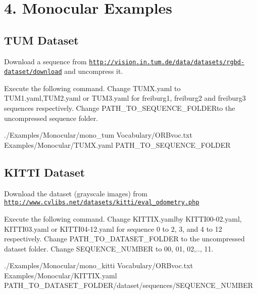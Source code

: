 \section*{4. Monocular Examples}

\subsection*{T\+UM Dataset}


\begin{DoxyEnumerate}
\item Download a sequence from \href{http://vision.in.tum.de/data/datasets/rgbd-dataset/download}{\tt http\+://vision.\+in.\+tum.\+de/data/datasets/rgbd-\/dataset/download} and uncompress it.
\item Execute the following command. Change {\ttfamily T\+U\+M\+X.\+yaml} to T\+U\+M1.\+yaml,T\+U\+M2.\+yaml or T\+U\+M3.\+yaml for freiburg1, freiburg2 and freiburg3 sequences respectively. Change {\ttfamily P\+A\+T\+H\+\_\+\+T\+O\+\_\+\+S\+E\+Q\+U\+E\+N\+C\+E\+\_\+\+F\+O\+L\+D\+ER}to the uncompressed sequence folder. 
\begin{DoxyCode}
./Examples/Monocular/mono\_tum Vocabulary/ORBvoc.txt Examples/Monocular/TUMX.yaml PATH\_TO\_SEQUENCE\_FOLDER
\end{DoxyCode}

\end{DoxyEnumerate}

\subsection*{K\+I\+T\+TI Dataset}


\begin{DoxyEnumerate}
\item Download the dataset (grayscale images) from \href{http://www.cvlibs.net/datasets/kitti/eval_odometry.php}{\tt http\+://www.\+cvlibs.\+net/datasets/kitti/eval\+\_\+odometry.\+php}
\item Execute the following command. Change {\ttfamily K\+I\+T\+T\+I\+X.\+yaml}by K\+I\+T\+T\+I00-\/02.\+yaml, K\+I\+T\+T\+I03.\+yaml or K\+I\+T\+T\+I04-\/12.\+yaml for sequence 0 to 2, 3, and 4 to 12 respectively. Change {\ttfamily P\+A\+T\+H\+\_\+\+T\+O\+\_\+\+D\+A\+T\+A\+S\+E\+T\+\_\+\+F\+O\+L\+D\+ER} to the uncompressed dataset folder. Change {\ttfamily S\+E\+Q\+U\+E\+N\+C\+E\+\_\+\+N\+U\+M\+B\+ER} to 00, 01, 02,.., 11. 
\begin{DoxyCode}
./Examples/Monocular/mono\_kitti Vocabulary/ORBvoc.txt Examples/Monocular/KITTIX.yaml
       PATH\_TO\_DATASET\_FOLDER/dataset/sequences/SEQUENCE\_NUMBER
\end{DoxyCode}

\end{DoxyEnumerate}

